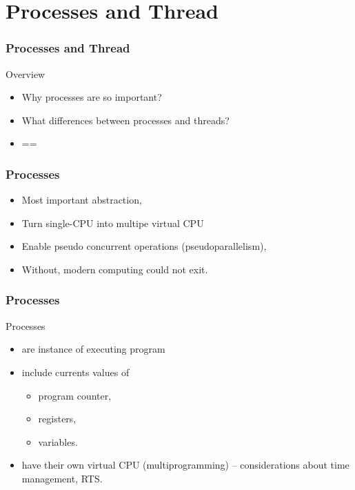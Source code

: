 \section{Processes and Thread}
  \begin{frame}
    \frametitle{Processes and Thread}
        \begin{block}{Overview}
          \begin{itemize}
            \item Why processes are so important?
            \item What differences between processes and threads?
            \item ==
          \end{itemize}
        \end{block}
  \end{frame}

  \begin{frame}
    \frametitle{Processes}
        \begin{itemize}
          \item Most important abstraction,
          \item Turn single-CPU into multipe virtual CPU
          \item Enable pseudo concurrent operations (pseudoparallelism),
          \item Without, modern computing could not exit.
        \end{itemize}
  \end{frame}

  \begin{frame}
    \frametitle{Processes}
        \begin{block}{Processes}
          \begin{itemize}
            \item are instance of executing program
            \item include currents values of
              \begin{itemize}
                \item program counter,
                \item registers,
                \item variables.
              \end{itemize}
            \item have their own virtual CPU (multiprogramming) -- considerations about time management, RTS.
          \end{itemize}
        \end{block}
  \end{frame}

